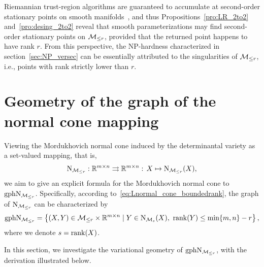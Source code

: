 Riemannian trust-region algorithms are guaranteed to accumulate at second-order stationary points on smooth manifolds~\cite{absil2007trustRTR}, and thus Propositions~\ref{pro:LR_2to2} and~\ref{pro:desing_2to2} reveal that smooth parameterizations may find second-order stationary points on $\mathcal{M}_{\le r}$, provided that the returned point happens to have rank $r$. From this perspective, the NP-hardness characterized in section~\ref{sec:NP_versec} can be essentially attributed to the singularities of $\mathcal{M}_{\le r}$, i.e., points with rank strictly lower than $r$.



\section{Geometry of the graph of the normal cone mapping}\label{sec:Geometryofgraph}
Viewing the Mordukhovich normal cone induced by the determinantal variety as a set-valued mapping, that is,
$$\mathrm{N}_{\mathcal{M}_{\le r}}: \mathbb{R}^{m\times n}\rightrightarrows\mathbb{R}^{m\times n}:\,X\mapsto \mathrm{N}_{\mathcal{M}_{\le r}}(X),$$
we aim to give an explicit formula for the Mordukhovich normal cone to $\mathrm{gph}\mathrm{N}_{\mathcal{M}_{\le r}}$. Specifically, according to~\eqref{eq:Lnormal_cone_boundedrank}, the graph of $\mathrm{N}_{\mathcal{M}_{\le r}}$ can be characterized by
\begin{equation*}
    \graph\Lnormal_{\boundedrank} = \hkh{(X,Y)\in\boundedrank\times \mbRmn\mid Y\in\normal_{\lowrank}(X),\ \rank(Y)\le \min\{m,n\}-r},
\end{equation*}
where we denote $s=\operatorname{rank}(X)$.

In this section, we investigate the variational geometry of $\mathrm{gph}\mathrm{N}_{\mathcal{M}_{\le r}}$, with the derivation illustrated below.
\begin{figure}[h]
	\centering
	\vspace{-4mm}
\end{figure}

